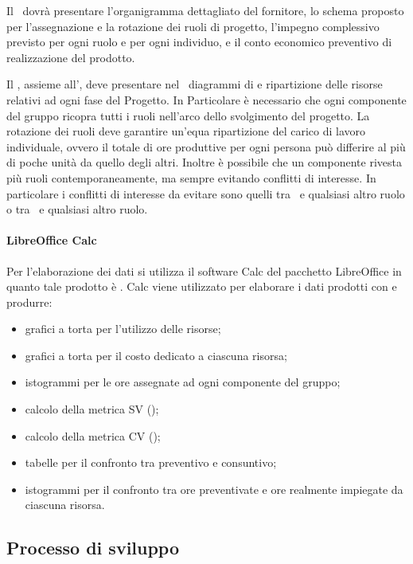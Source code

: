 \documentclass[12pt,a4paper]{article}
\begin{document}
Il \PdP\ dovrà presentare l'organigramma dettagliato del fornitore, lo schema proposto per l'assegnazione e la rotazione dei ruoli di progetto, l'impegno complessivo previsto per ogni ruolo e per ogni individuo, e il conto economico preventivo di realizzazione del prodotto.

Il \PM, assieme all'\AM, deve presentare nel \PdP\ diagrammi di  e ripartizione delle risorse relativi ad ogni fase del Progetto. In Particolare è necessario che ogni componente del gruppo ricopra tutti i ruoli nell'arco dello svolgimento del progetto. La rotazione dei ruoli deve garantire un'equa ripartizione del carico di lavoro individuale, ovvero il totale di ore produttive per ogni persona può differire al più di poche unità da quello degli altri. Inoltre è possibile che un componente rivesta più ruoli contemporaneamente, ma sempre evitando conflitti di interesse. In particolare i conflitti di interesse da evitare sono quelli tra \PM\ e qualsiasi altro ruolo o tra \VR\ e qualsiasi altro ruolo.


\paragraph{LibreOffice Calc}
Per l’elaborazione dei dati si utilizza il software Calc del pacchetto LibreOffice in quanto tale prodotto è . Calc viene utilizzato per elaborare i dati prodotti con  e produrre:
\begin{itemize}
	\item grafici a torta per l’utilizzo delle risorse;
	\item grafici a torta per il costo dedicato a ciascuna risorsa;
	\item istogrammi per le ore assegnate ad ogni componente del gruppo;
	\item calcolo della metrica SV ();
	\item calcolo della metrica CV ();
	\item tabelle per il confronto tra preventivo e consuntivo;
	\item istogrammi per il confronto tra ore preventivate e ore realmente impiegate da ciascuna risorsa.
\end{itemize}

\subsection{Processo di sviluppo}
\end{document}
